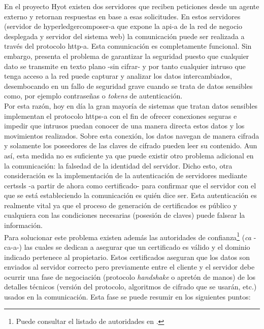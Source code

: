 \documentclass[12pt,a4paper, twoside]{report}
\begin{document}
	
	En el proyecto Hyot existen dos servidores que reciben peticiones desde un agente externo y retornan respuestas en base a esas solicitudes. En estos servidores (servidor de \gls{hyperledgercomposer-a} que expone la \gls{api-a} de la red de negocio desplegada y servidor del sistema web) la comunicación puede ser realizada a través del protocolo \gls{http-a}. Esta comunicación es completamente funcional. Sin embargo, presenta el problema de garantizar la seguridad puesto que cualquier dato se transmite en texto plano -sin cifrar- y por tanto cualquier intruso que tenga acceso a la red puede capturar y analizar los datos intercambiados, desembocando en un fallo de seguridad grave cuando se trata de datos sensibles como, por ejemplo contraseñas o \textit{\glspl{token}} de autenticación. \\

	Por esta razón, hoy en día la gran mayoría de sistemas que tratan datos sensibles implementan el protocolo \gls{https-a} con el fin de ofrecer conexiones seguras e impedir que intrusos puedan conocer de una manera directa estos datos y los movimientos realizados. Sobre esta conexión, los datos navegan de manera cifrada y solamente los poseedores de las claves de cifrado pueden leer su contenido. Aun así, esta medida no es suficiente ya que puede existir otro problema adicional en la comunicación: la falsedad de la identidad del servidor. Dicho esto, otra consideración es la implementación de la autenticación de servidores mediante \glspl{certssl} -a partir de ahora como certificado- para confirmar que el servidor con el que se está estableciendo la comunicación es quién dice ser. Esta autenticación es realmente vital ya que el proceso de generación de certificados es público y cualquiera con las condiciones necesarias (posesión de claves) puede falsear la información.  \\
	
	Para solucionar este problema existen además las autoridades de confianza\footnote{Puede consultar el listado de autoridades en \cite{cab:members}.} (\textit{\gls{ca}} -\gls{ca-a}-) las cuales se dedican a asegurar que un certificado es válido y el dominio indicado pertenece al propietario. Estos certificados aseguran que los datos son enviados al servidor correcto pero previamente entre el cliente y el servidor debe ocurrir una fase de negociación (protocolo \textit{handshake} o apretón de manos) de los detalles técnicos (versión del protocolo, algoritmos de cifrado que se usarán, etc.) usados en la comunicación. Esta fase se puede resumir en los siguientes puntos:
	
\end{document}
